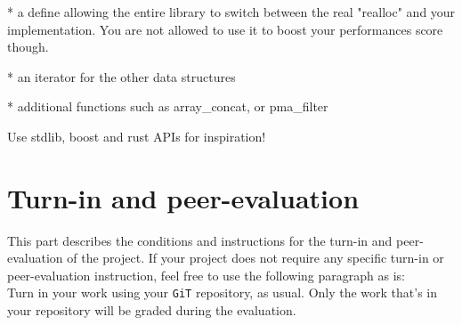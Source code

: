 \documentclass{42-en}
\begin{document}
    * a define allowing the entire library to switch between the real "realloc" and your
    implementation. You are not allowed to use it to boost your performances score though.

    * an iterator for the other data structures

    * additional functions such as array_concat, or pma_filter

    Use stdlib, boost and rust APIs for inspiration!


\chapter{Turn-in and peer-evaluation}

    This part describes the conditions and instructions for the turn-in and
    peer-evaluation of the project. If your project does not
    require any specific turn-in or peer-evaluation instruction, feel free to
    use the following paragraph as is:\\

    Turn in your work using your \texttt{GiT} repository, as
    usual. Only the work that's in your repository will be graded during
    the evaluation.



\end{document}
